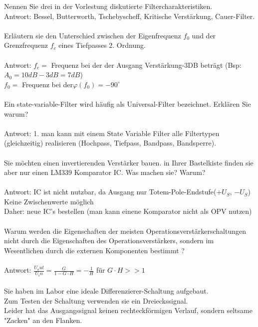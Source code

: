 \documentclass[A4]{scrartcl}
\begin{document}
  Nennen Sie drei in der Vorlestung diskutierte Filtercharakteristiken.
  \\
  Antwort: Bessel, Butterworth, Tschebyscheff, Kritische Verstärkung, Cauer-Filter.\\\\
  Erläutern sie den Unterschied zwischen der Eigenfrequenz $f_0$ und der Grenzfrequenz $f_c$ eines Tiefpasses 2. Ordnung.\\
  \\
  Antwort:
  $f_c = $ Frequenz bei der der Ausgang Verstärkung-3DB beträgt (Bsp: $A_0 = 10dB - 3dB = 7dB $)\\
  $f_0 = $ Frequenz bei der$\varphi(f_0) = -90^\circ$\\\\
  Ein state-variable-Filter wird häufig als Universal-Filter bezeichnet. Erklären Sie warum?\\
  \\
  Antwort: 1. man kann mit einem State Variable Filter alle Filtertypen (gleichzeitig) realisieren (Hochpass, Tiefpass, Bandpass, Bandsperre).\\\\
  Sie möchten einen invertierenden Verstärker bauen. in Ihrer Bastelkiste finden sie aber nur einen LM339 Komparator IC. Was machen sie? Warum?\\
  \\
  Antwort: IC ist nicht nutzbar, da Ausgang nur Totem-Pole-Endstufe($ +U_S$, $-U_S$)\\
  Keine Zwischenwerte möglich\\
  Daher: neue IC's bestellen (man kann einene Komparator nicht als OPV nutzen)\\\\
  Warum werden die Eigenschaften der meisten Operationsverstärkerschaltungen nicht durch die Eigenschaften des Operationsverstärkers, sondern im Wesentlichen durch die externen Komponenten bestimmt ?\\
  \\
  Antwort: $\frac{U_out}{U_in} = \frac{G}{1-G\cdot H} = -\frac{1}{H}$ für $G\cdot H >> 1$\\\\
  Sie haben im Labor eine ideale Differenzierer-Schaltung aufgebaut.\\
  Zum Testen der Schaltung verwenden sie ein Dreieckssignal.\\
  Leider hat das Ausgangssignal keinen rechteckförmigen Verlauf, sondern seltsame "Zacken" an den Flanken.\\
\end{document}
